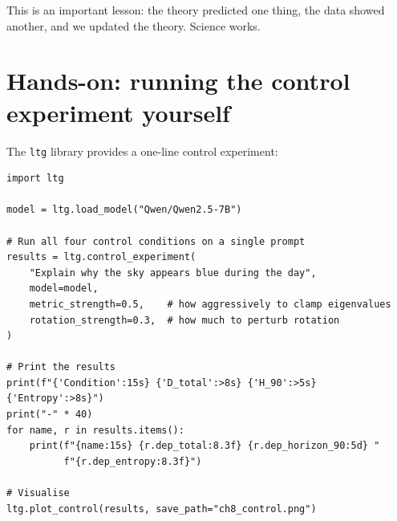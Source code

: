 \documentclass[11pt, twoside, openright]{memoir}
\begin{document}
This is an important lesson: the theory predicted one thing, the data
showed another, and we updated the theory. Science works.

\section{Hands-on: running the control experiment yourself}

The \texttt{ltg} library provides a one-line control experiment:

\begin{lstlisting}[caption={Running the four-condition control study}]
import ltg

model = ltg.load_model("Qwen/Qwen2.5-7B")

# Run all four control conditions on a single prompt
results = ltg.control_experiment(
    "Explain why the sky appears blue during the day",
    model=model,
    metric_strength=0.5,    # how aggressively to clamp eigenvalues
    rotation_strength=0.3,  # how much to perturb rotation
)

# Print the results
print(f"{'Condition':15s} {'D_total':>8s} {'H_90':>5s} {'Entropy':>8s}")
print("-" * 40)
for name, r in results.items():
    print(f"{name:15s} {r.dep_total:8.3f} {r.dep_horizon_90:5d} "
          f"{r.dep_entropy:8.3f}")

# Visualise
ltg.plot_control(results, save_path="ch8_control.png")
\end{lstlisting}
\end{document}
